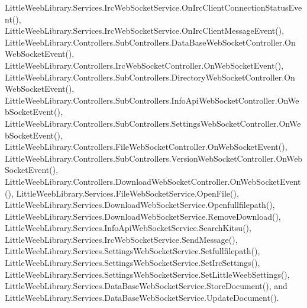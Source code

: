 Little\+Weeb\+Library.\+Services.\+Irc\+Web\+Socket\+Service.\+On\+Irc\+Client\+Connection\+Status\+Event(), Little\+Weeb\+Library.\+Services.\+Irc\+Web\+Socket\+Service.\+On\+Irc\+Client\+Message\+Event(), Little\+Weeb\+Library.\+Controllers.\+Sub\+Controllers.\+Data\+Base\+Web\+Socket\+Controller.\+On\+Web\+Socket\+Event(), Little\+Weeb\+Library.\+Controllers.\+Irc\+Web\+Socket\+Controller.\+On\+Web\+Socket\+Event(), Little\+Weeb\+Library.\+Controllers.\+Sub\+Controllers.\+Directory\+Web\+Socket\+Controller.\+On\+Web\+Socket\+Event(), Little\+Weeb\+Library.\+Controllers.\+Sub\+Controllers.\+Info\+Api\+Web\+Socket\+Controller.\+On\+Web\+Socket\+Event(), Little\+Weeb\+Library.\+Controllers.\+Sub\+Controllers.\+Settings\+Web\+Socket\+Controller.\+On\+Web\+Socket\+Event(), Little\+Weeb\+Library.\+Controllers.\+File\+Web\+Socket\+Controller.\+On\+Web\+Socket\+Event(), Little\+Weeb\+Library.\+Controllers.\+Sub\+Controllers.\+Version\+Web\+Socket\+Controller.\+On\+Web\+Socket\+Event(), Little\+Weeb\+Library.\+Controllers.\+Download\+Web\+Socket\+Controller.\+On\+Web\+Socket\+Event(), Little\+Weeb\+Library.\+Services.\+File\+Web\+Socket\+Service.\+Open\+File(), Little\+Weeb\+Library.\+Services.\+Download\+Web\+Socket\+Service.\+Openfullfilepath(), Little\+Weeb\+Library.\+Services.\+Download\+Web\+Socket\+Service.\+Remove\+Download(), Little\+Weeb\+Library.\+Services.\+Info\+Api\+Web\+Socket\+Service.\+Search\+Kitsu(), Little\+Weeb\+Library.\+Services.\+Irc\+Web\+Socket\+Service.\+Send\+Message(), Little\+Weeb\+Library.\+Services.\+Settings\+Web\+Socket\+Service.\+Setfullfilepath(), Little\+Weeb\+Library.\+Services.\+Settings\+Web\+Socket\+Service.\+Set\+Irc\+Settings(), Little\+Weeb\+Library.\+Services.\+Settings\+Web\+Socket\+Service.\+Set\+Little\+Weeb\+Settings(), Little\+Weeb\+Library.\+Services.\+Data\+Base\+Web\+Socket\+Service.\+Store\+Document(), and Little\+Weeb\+Library.\+Services.\+Data\+Base\+Web\+Socket\+Service.\+Update\+Document().


